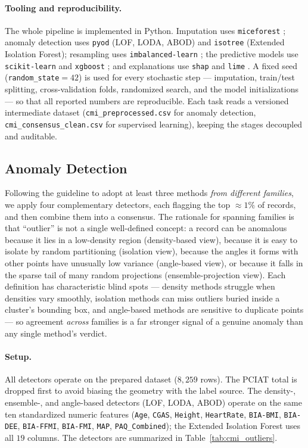 \paragraph{Tooling and reproducibility.} The whole pipeline is implemented in Python. Imputation uses \texttt{miceforest} \cite{miceforest}; anomaly detection uses \texttt{pyod} \cite{pyod} (LOF, LODA, ABOD) and \texttt{isotree} (Extended Isolation Forest); resampling uses \texttt{imbalanced-learn} \cite{imblearn}; the predictive models use \texttt{scikit-learn} \cite{sklearn} and \texttt{xgboost} \cite{xgboost}; and explanations use \texttt{shap} \cite{shap} and \texttt{lime} \cite{lime}. A fixed seed (\texttt{random\_state}$=42$) is used for every stochastic step --- imputation, train/test splitting, cross-validation folds, randomized search, and the model initializations --- so that all reported numbers are reproducible. Each task reads a versioned intermediate dataset (\texttt{cmi\_preprocessed.csv} for anomaly detection, \texttt{cmi\_consensus\_clean.csv} for supervised learning), keeping the stages decoupled and auditable.

\subsection{Anomaly Detection}
Following the guideline to adopt at least three methods \emph{from different families}, we apply four complementary detectors, each flagging the top $\approx 1\%$ of records, and then combine them into a consensus. The rationale for spanning families is that ``outlier'' is not a single well-defined concept: a record can be anomalous because it lies in a low-density region (density-based view), because it is easy to isolate by random partitioning (isolation view), because the angles it forms with other points have unusually low variance (angle-based view), or because it falls in the sparse tail of many random projections (ensemble-projection view). Each definition has characteristic blind spots --- density methods struggle when densities vary smoothly, isolation methods can miss outliers buried inside a cluster's bounding box, and angle-based methods are sensitive to duplicate points --- so agreement \emph{across} families is a far stronger signal of a genuine anomaly than any single method's verdict.

\paragraph{Setup.} All detectors operate on the prepared dataset ($8{,}259$ rows). The PCIAT total is dropped first to avoid biasing the geometry with the label source. The density-, ensemble-, and angle-based detectors (LOF, LODA, ABOD) operate on the same ten standardized numeric features (\texttt{Age}, \texttt{CGAS}, \texttt{Height}, \texttt{HeartRate}, \texttt{BIA-BMI}, \texttt{BIA-DEE}, \texttt{BIA-FFMI}, \texttt{BIA-FMI}, \texttt{MAP}, \texttt{PAQ\_Combined}); the Extended Isolation Forest uses all $19$ columns. The detectors are summarized in Table~\ref{tab:cmi_outliers}.

